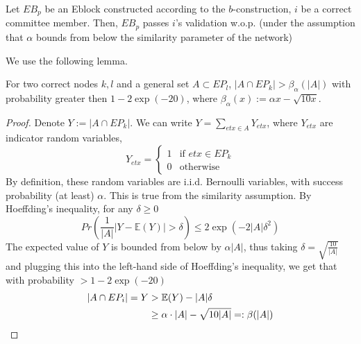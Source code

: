 \begin{claim}  \label{liveness} Let $EB_p$ be an Eblock constructed according to the $b$-construction, $i$ be a correct committee member. Then, $EB_p$ passes $i$'s validation w.o.p. (under the assumption that $\alpha$ bounds from below the similarity parameter of the network)
\end{claim}
\noindent We use the following lemma.
\begin{lemma}
For two correct nodes $k,l$ and a general set $A\subset EP_l$, $|A\cap EP_k|>\beta_\alpha(|A|)$ with probability greater then $1-2\exp(-20)$, where $\beta_\alpha(x):=\alpha x-\sqrt{10x}$.
\end{lemma}
\begin{proof}
Denote $Y:=|A\cap EP_k|$. We can write $Y=\sum_{etx\in A}Y_{etx}$, where $Y_{etx}$ are indicator random variables, 
\begin{equation*}
    		Y_{etx} =	
		    \begin{cases}
    			  1  &\mbox{if }  etx\in EP_k \\
     			  0  &\mbox{otherwise}
		     \end{cases}
  	\end{equation*}
By definition, these random variables are i.i.d. Bernoulli variables, with success probability (at least) $\alpha$. This is true from the similarity assumption. By Hoeffding's inequality, for any $\delta \ge 0$
$$Pr \left( \frac{1}{|A|}|Y-\mathbb{E}(Y)| >\delta \right) \leq 2\exp(-2|A|\delta^2)$$
The expected value of $Y$ is bounded from below by $\alpha |A|$, thus taking $\delta=\sqrt{\frac{10}{|A|}}$ and plugging this into the left-hand side of Hoeffding's inequality, we get that with probability $>1-2\exp(-20)$ 
\begin{equation*}\begin{split}|A\cap EP_i|= Y&>\mathbb{E}(Y)-|A|\delta\\ &\ge \alpha\cdot |A|-\sqrt{10|A|}=:\beta(|A|) \qedhere
\end{split}\end{equation*} 
\end{proof}

